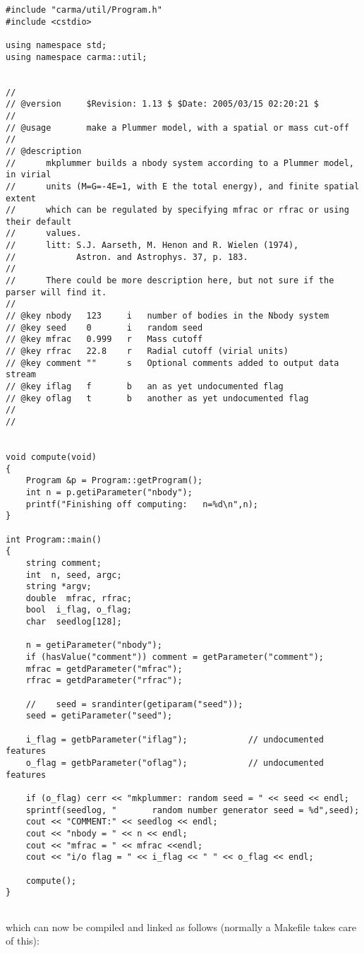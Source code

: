 \documentclass[preprint]{aastex} %
\begin{document}
\footnotesize
\begin{verbatim}
#include "carma/util/Program.h"
#include <cstdio>

using namespace std;
using namespace carma::util;


//
// @version     $Revision: 1.13 $ $Date: 2005/03/15 02:20:21 $
//
// @usage       make a Plummer model, with a spatial or mass cut-off
//
// @description
//      mkplummer builds a nbody system according to a Plummer model, in virial
//      units (M=G=-4E=1, with E the total energy), and finite spatial extent
//      which can be regulated by specifying mfrac or rfrac or using their default
//      values.
//      litt: S.J. Aarseth, M. Henon and R. Wielen (1974),
//            Astron. and Astrophys. 37, p. 183.
//
//      There could be more description here, but not sure if the parser will find it.
//
// @key nbody   123     i   number of bodies in the Nbody system
// @key seed    0       i   random seed
// @key mfrac   0.999   r   Mass cutoff
// @key rfrac   22.8    r   Radial cutoff (virial units)
// @key comment ""      s   Optional comments added to output data stream
// @key iflag   f       b   an as yet undocumented flag
// @key oflag   t       b   another as yet undocumented flag
//
//


void compute(void)
{
    Program &p = Program::getProgram();
    int n = p.getiParameter("nbody");
    printf("Finishing off computing:   n=%d\n",n);
}
 
int Program::main()
{
    string comment;
    int  n, seed, argc;
    string *argv;
    double  mfrac, rfrac;
    bool  i_flag, o_flag;
    char  seedlog[128];
 
    n = getiParameter("nbody");
    if (hasValue("comment")) comment = getParameter("comment");
    mfrac = getdParameter("mfrac");
    rfrac = getdParameter("rfrac");
 
    //    seed = srandinter(getiparam("seed"));
    seed = getiParameter("seed");
 
    i_flag = getbParameter("iflag");            // undocumented features
    o_flag = getbParameter("oflag");            // undocumented features

    if (o_flag) cerr << "mkplummer: random seed = " << seed << endl;
    sprintf(seedlog, "       random number generator seed = %d",seed);
    cout << "COMMENT:" << seedlog << endl;
    cout << "nbody = " << n << endl;
    cout << "mfrac = " << mfrac <<endl;
    cout << "i/o flag = " << i_flag << " " << o_flag << endl;
 
    compute();
}
 

\end{verbatim}
\normalsize
which can now be compiled and linked as follows (normally a Makefile takes care of this):
\end{document}
